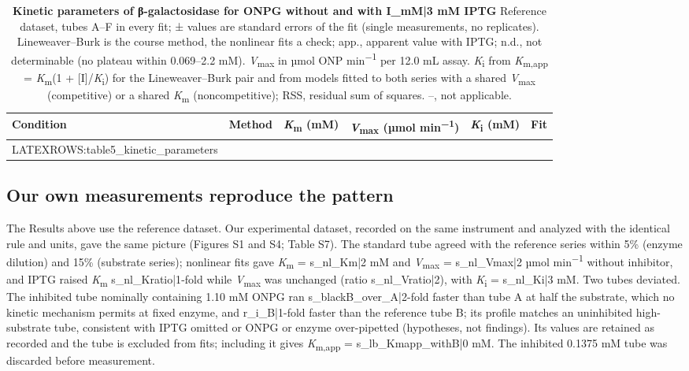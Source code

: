 \documentclass[9pt,twocolumn]{extarticle}
\newcommand{\Km}{\textit{K}\textsubscript{m}}
\newcommand{\Kmapp}{\textit{K}\textsubscript{m,app}}
\newcommand{\Vmax}{\textit{V}\textsubscript{max}}
\newcommand{\Ki}{\textit{K}\textsubscript{i}}
\newcommand{\permin}{min\textsuperscript{−1}}
\newcommand{\umolmin}{µmol min\textsuperscript{−1}}
\newcommand{\dash}{–}
\begin{document}
\begin{table}[b]
\caption{\textbf{Kinetic parameters of β-galactosidase for ONPG without and with {{I_mM|3}} mM IPTG}\newline
Reference dataset, tubes A\dash F in every fit; ± values are standard errors of the fit (single measurements, no replicates). Lineweaver\dash Burk is the course method, the nonlinear fits a check; app., apparent value with IPTG; n.d., not determinable (no plateau within 0.069\dash 2.2 mM). \Vmax{} in µmol ONP \permin{} per 12.0 mL assay. \Ki{} from \Kmapp{} = \Km(1 + [I]/\Ki) for the Lineweaver\dash Burk pair and from models fitted to both series with a shared \Vmax{} (competitive) or a shared \Km{} (noncompetitive); RSS, residual sum of squares. –, not applicable.}
\footnotesize
\begin{tabularx}{\textwidth}{@{}llrrrX@{}}
\toprule
Condition & Method & \Km{} (mM) & \Vmax{} (\umolmin) & \Ki{} (mM) & Fit \\
\midrule
{{LATEXROWS:table5_kinetic_parameters}}
\bottomrule
\end{tabularx}
\end{table}

\subsection{Our own measurements reproduce the pattern}
The Results above use the reference dataset. Our experimental dataset, recorded on the same instrument and analyzed with the identical rule and units, gave the same picture (Figures S1 and S4; Table S7). The standard tube agreed with the reference series within 5\% (enzyme dilution) and 15\% (substrate series); nonlinear fits gave \Km{} = {{s_nl_Km|2}} mM and \Vmax{} = {{s_nl_Vmax|2}} \umolmin{} without inhibitor, and IPTG raised \Km{} {{s_nl_Kratio|1}}-fold while \Vmax{} was unchanged (ratio {{s_nl_Vratio|2}}), with \Ki{} = {{s_nl_Ki|3}} mM. Two tubes deviated. The inhibited tube nominally containing 1.10 mM ONPG ran {{s_blackB_over_A|2}}-fold faster than tube A at half the substrate, which no kinetic mechanism permits at fixed enzyme, and {{r_i_B|1}}-fold faster than the reference tube B; its profile matches an uninhibited high-substrate tube, consistent with IPTG omitted or ONPG or enzyme over-pipetted (hypotheses, not findings). Its values are retained as recorded and the tube is excluded from fits; including it gives \Kmapp{} = {{s_lb_Kmapp_withB|0}} mM. The inhibited 0.1375 mM tube was discarded before measurement.
\end{document}
